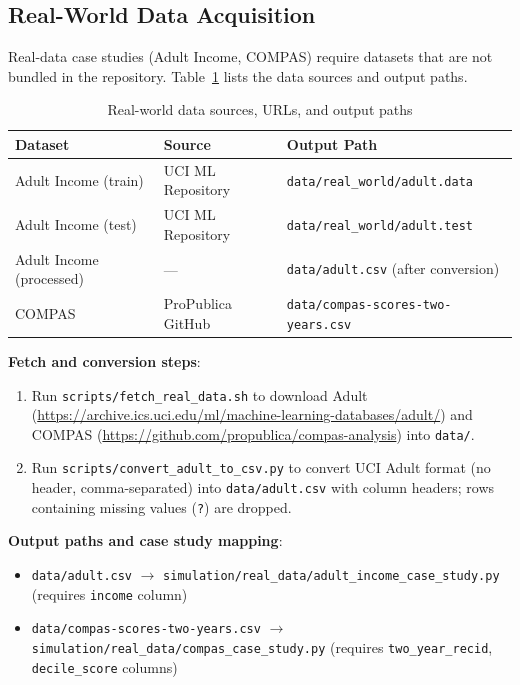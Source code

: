 \documentclass[12pt,a4paper]{article}
\theoremstyle{definition}
\theoremstyle{remark}
\begin{document}
\subsection{Real-World Data Acquisition}
\label{subsec:real_world_data}

Real-data case studies (Adult Income, COMPAS) require datasets that are not bundled in the repository. Table~\ref{tab:real_data_sources} lists the data sources and output paths.

\begin{table}[htbp]
\centering
\caption{Real-world data sources, URLs, and output paths}
\label{tab:real_data_sources}
\begin{tabular}{lll}
\toprule
\textbf{Dataset} & \textbf{Source} & \textbf{Output Path} \\
\midrule
Adult Income (train) & UCI ML Repository & \texttt{data/real\_world/adult.data} \\
Adult Income (test) & UCI ML Repository & \texttt{data/real\_world/adult.test} \\
Adult Income (processed) & --- & \texttt{data/adult.csv} (after conversion) \\
COMPAS & ProPublica GitHub & \texttt{data/compas-scores-two-years.csv} \\
\bottomrule
\end{tabular}
\end{table}

\textbf{Fetch and conversion steps}:
\begin{enumerate}
    \item Run \texttt{scripts/fetch\_real\_data.sh} to download Adult (\url{https://archive.ics.uci.edu/ml/machine-learning-databases/adult/}) and COMPAS (\url{https://github.com/propublica/compas-analysis}) into \texttt{data/}.
    \item Run \texttt{scripts/convert\_adult\_to\_csv.py} to convert UCI Adult format (no header, comma-separated) into \texttt{data/adult.csv} with column headers; rows containing missing values (\texttt{?}) are dropped.
\end{enumerate}

\textbf{Output paths and case study mapping}:
\begin{itemize}
    \item \texttt{data/adult.csv} $\rightarrow$ \texttt{simulation/real\_data/adult\_income\_case\_study.py} (requires \texttt{income} column)
    \item \texttt{data/compas-scores-two-years.csv} $\rightarrow$ \texttt{simulation/real\_data/compas\_case\_study.py} (requires \texttt{two\_year\_recid}, \texttt{decile\_score} columns)
\end{itemize}
\end{document}
